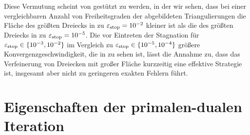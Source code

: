 Diese Vermutung scheint von  gestützt zu werden, in der
wir sehen, dass bei einer vergleichbaren Anzahl von Freiheitsgraden der
abgebildeten Triangulierungen die Fläche des größten Dreiecks in
 zu $\varepsilon_{\textup{stop}}=10^{-2}$ kleiner ist als die des
größten Dreiecks in  zu $\varepsilon_{\textup{stop}}=10^{-5}$. 
Die vor Eintreten der Stagnation für $\varepsilon_{\textup{stop}}\in\{10^{-3},10^{-2}\}$ im
Vergleich zu $\varepsilon_{\textup{stop}}\in\{10^{-5},10^{-4}\}$ größere
Konvergenzgeschwindigkeit, die in  zu sehen
ist, lässt die Annahme zu, dass das Verfeinerung von Dreiecken mit großer
Fläche kurzzeitig eine effektive Strategie ist, insgesamt aber nicht zu
geringeren exakten Fehlern führt.


\section{Eigenschaften der primalen-dualen Iteration}
\label{sec:experimentsPrimalDualIteration}

